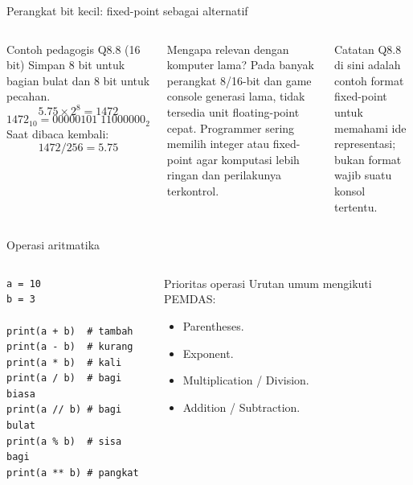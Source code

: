 \documentclass[aspectratio=169,11pt]{beamer}
\begin{document}
\begin{frame}{Perangkat bit kecil: fixed-point sebagai alternatif}
\begin{columns}[T]
\begin{block}{Contoh pedagogis Q8.8 (16 bit)}
Simpan 8 bit untuk bagian bulat dan 8 bit untuk pecahan.
\[
5.75\times 2^8 = 1472
\]
\[
1472_{10}=00000101\;11000000_2
\]
Saat dibaca kembali:
\[
1472/256=5.75
\]
\end{block}
\begin{block}{Mengapa relevan dengan komputer lama?}
Pada banyak perangkat 8/16-bit dan game console generasi lama, tidak tersedia unit floating-point cepat. Programmer sering memilih integer atau fixed-point agar komputasi lebih ringan dan perilakunya terkontrol.
\end{block}
\begin{alertblock}{Catatan}
Q8.8 di sini adalah contoh format fixed-point untuk memahami ide representasi; bukan format wajib suatu konsol tertentu.
\end{alertblock}
\end{columns}
\end{frame}

\begin{frame}[fragile]{Operasi aritmatika}
\begin{columns}[T]
\begin{lstlisting}[style=py]
a = 10
b = 3

print(a + b)  # tambah
print(a - b)  # kurang
print(a * b)  # kali
print(a / b)  # bagi biasa
print(a // b) # bagi bulat
print(a % b)  # sisa bagi
print(a ** b) # pangkat
\end{lstlisting}
\begin{block}{Prioritas operasi}
Urutan umum mengikuti PEMDAS:
\begin{itemize}
  \item Parentheses.
  \item Exponent.
  \item Multiplication / Division.
  \item Addition / Subtraction.
\end{itemize}
\end{block}
\end{columns}
\end{frame}
\end{document}
